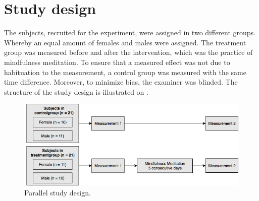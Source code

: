 \vspace{-.5cm}

\section{Study design} 

The subjects, recruited for the experiment, were assigned in two different groups. Whereby an equal amount of females and males were assigned. The treatment group was measured before and after the intervention, which was the practice of mindfulness meditation. To ensure that a measured effect was not due to habituation to the measurement, a control group was measured with the same time difference. Moreover, to minimize bias, the examiner was blinded. The structure of the study design is illustrated on .

\begin{figure}[H]
	\includegraphics[width=1\textwidth]{figures/studydesign.png} 
	\caption{Parallel study design.}
	\label{fig:studydesign}  
\end{figure}  


